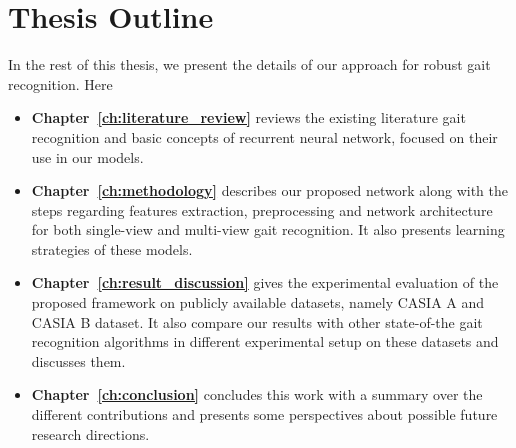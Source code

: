 \section{Thesis Outline} 
In the rest of this thesis, we present the details of our approach for robust gait recognition. Here
\begin{itemize}
\item \textbf{Chapter~\ref{ch:literature_review}} reviews the existing literature gait recognition and basic concepts of recurrent neural network, focused on their use in our models. 
\item \textbf{Chapter~\ref{ch:methodology}} describes our proposed network along with the steps regarding features extraction, preprocessing and network architecture for both single-view and multi-view gait recognition. It also presents learning strategies of these models. 

\item \textbf{Chapter~\ref{ch:result_discussion}} gives the experimental evaluation of the proposed framework on publicly available datasets, namely CASIA A and CASIA B dataset. It also compare our results with other state-of-the gait recognition algorithms in different experimental setup on these datasets and discusses them. 

\item \textbf{Chapter~\ref{ch:conclusion}} concludes this work with a summary over the different contributions and presents some perspectives about possible future research directions.
\end{itemize}


